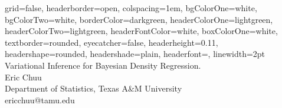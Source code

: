 \documentclass[a0paper,portrait]{baposter}
\begin{document}

\begin{poster}
{
grid=false,
headerborder=open, %
colspacing=1em, %
bgColorOne=white, %
bgColorTwo=white, %
borderColor=darkgreen, %
headerColorOne=lightgreen, %
headerColorTwo=lightgreen, %
headerFontColor=white, %
boxColorOne=white, %
textborder=rounded, %
eyecatcher=false, %
headerheight=0.11\textheight, %
headershape=rounded, %
headershade=plain,
headerfont=\Large\textsf, %
linewidth=2pt %
}
{}
%
%
{
\textsf %
{Variational Inference for Bayesian Density Regression.
}
} %
{\sf\vspace{0.5em}\\
Eric Chuu
\vspace{0.1em}\\
\small{Department of Statistics, Texas A&M University
\vspace{0.2em}\\
ericchuu@tamu.edu}
}



\end{poster}
\end{document}
